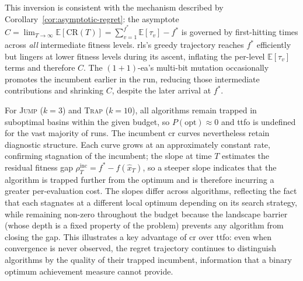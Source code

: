 This inversion is consistent with the mechanism described by
Corollary~\ref{cor:asymptotic-regret}:
the asymptote $C = \lim_{T \to \infty} \mathbb{E}[\mathrm{CR}(T)] =
\sum_{v=1}^{f^{*}} \mathbb{E}[\tau_v] - f^{*}$ is governed by
first-hitting times across \emph{all} intermediate fitness
levels. \acrshort{rls}'s greedy trajectory
reaches $f^{*}$ efficiently but lingers at lower fitness levels during
its ascent, inflating the per-level $\mathbb{E}[\tau_v]$ terms and
therefore $C$. The $(1+1)$-\acrshort{ea}'s multi-bit mutation
occasionally promotes the incumbent earlier in the run, reducing those
intermediate contributions and shrinking $C$, despite the later arrival
at $f^{*}$.

For \textsc{Jump} ($k=3$) and \textsc{Trap} ($k=10$), all algorithms
remain trapped in suboptimal basins within the given budget, so
$P(\mathrm{opt}) \approx 0$ and \acrshort{ttfo} is undefined for the
vast majority of runs. The incumbent \acrshort{cr} curves nevertheless
retain diagnostic structure. Each curve grows at an approximately
constant rate, confirming stagnation of the incumbent; the slope at
time $T$ estimates the residual fitness gap $\rho_T^{\mathrm{inc}} =
f^{*} - f(\hat{x}_T)$, so a steeper slope indicates that the
algorithm is trapped further from the optimum and is therefore
incurring a greater per-evaluation cost. The slopes differ across
algorithms, reflecting the fact that each stagnates at a different
local optimum depending on its search strategy, while remaining
non-zero throughout the budget because the landscape barrier (whose
depth is a fixed property of the problem) prevents any
algorithm from closing the gap. This illustrates a key advantage of
\acrshort{cr} over \acrshort{ttfo}: even when convergence is never
observed, the regret trajectory continues to distinguish algorithms
by the quality of their trapped incumbent, information that a binary
optimum achievement measure cannot provide.


